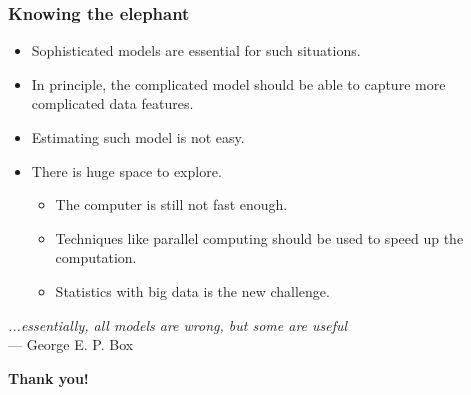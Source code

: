\documentclass[11pt]{beamer}
\begin{document}
\begin{frame}
  \frametitle{Knowing the elephant}

  \begin{itemize}
  \item Sophisticated models are essential for such situations.
  \item In principle, the complicated model should be able to capture more
    complicated data features.
  \item Estimating such model is not easy.
  \item There is huge space to explore.
    \begin{itemize}
    \item The computer is still not fast enough.
    \item Techniques like parallel
      computing should be used to speed up the computation.
    \item Statistics with big data is the new challenge.
    \end{itemize}
  \end{itemize}
\end{frame}




\begin{frame}[plain]

  \addtocounter{framenumber}{-1}

\emph{...essentially, all models are wrong, but some are useful}\\
\hfill --- George E. P. Box
\vspace{1cm}
  \begin{center}
    {\color{SUblue} \textbf{\Huge Thank you!}}
  \end{center}


\end{frame}
\end{document}
